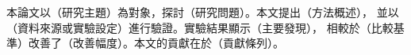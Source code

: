 
本論文以（研究主題）為對象，探討（研究問題）。本文提出（方法概述），
並以（資料來源或實驗設定）進行驗證。實驗結果顯示（主要發現），
相較於（比較基準）改善了（改善幅度）。本文的貢獻在於（貢獻條列）。
